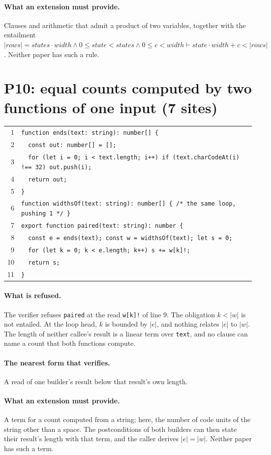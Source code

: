 \documentclass[10pt,a4paper]{article}
\theoremstyle{definition}
\theoremstyle{remark}
\newcommand{\len}[1]{|#1|}
\newcommand{\code}[1]{\texttt{#1}}
\newcommand{\entry}[1]{\paragraph{#1.}}
\begin{document}
\entry{What an extension must provide} Clauses and arithmetic that admit a product of two
variables, together with the entailment
$\len{\mathit{rows}}=\mathit{states}\cdot\mathit{width}\wedge 0\le\mathit{state}<\mathit{states}\wedge0\le c<\mathit{width}\vdash\mathit{state}\cdot\mathit{width}+c<\len{\mathit{rows}}$.
Neither paper has such a rule.

\section{P10: equal counts computed by two functions of one input (7 sites)}

{\footnotesize
\begin{tabular}{@{}r@{\hspace{1em}}l@{}}
1 & \code{function ends(text: string): number[] \{} \\
2 & \code{~~const out: number[] = [];} \\
3 & \code{~~for (let i = 0; i < text.length; i++) if (text.charCodeAt(i) !== 32) out.push(i);} \\
4 & \code{~~return out;} \\
5 & \code{\}} \\
6 & \code{function widthsOf(text: string): number[] \{ /* the same loop, pushing 1 */ \}} \\
7 & \code{export function paired(text: string): number \{} \\
8 & \code{~~const e = ends(text); const w = widthsOf(text); let s = 0;} \\
9 & \code{~~for (let k = 0; k < e.length; k++) s += w[k]!;} \\
10 & \code{~~return s;} \\
11 & \code{\}} \\
\end{tabular}}

\entry{What is refused} The verifier refuses \code{paired} at the read
\code{w[k]!} of line 9. The obligation $k<\len w$ is not entailed. At
the loop head, $k$ is bounded by $\len e$, and nothing relates $\len e$ to $\len w$. The length of
neither callee's result is a linear term over \code{text}, and no
clause can name a count that both functions compute.

\entry{The nearest form that verifies} A read of one builder's result below that result's own
length.

\entry{What an extension must provide} A term for a count computed from a string; here, the
number of code units of the string other than a space. The
postconditions of both builders can then state their result's length
with that term, and the caller derives $\len e=\len w$. Neither paper
has such a term.
\end{document}
